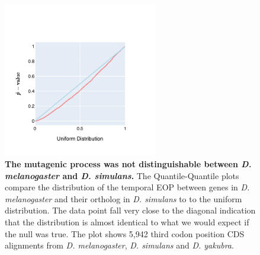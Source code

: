 \begin{figure}[htbp]
\centering
\includegraphics[width=0.6\textwidth]{figures/plots/drosophila/temp-EOP-QQ.pdf}
\caption{\textbf{The mutagenic process was not distinguishable between \textit{D. melanogaster} and \textit{D. simulans}.} The Quantile-Quantile plots compare the distribution of the temporal EOP between genes in \textit{D. melanogaster} and their ortholog in \textit{D. simulans} to  to the uniform distribution. The data point fall very close to the diagonal indication that the distribution is almost identical to what we would expect if the null was true. The plot shows 5,942 third codon position CDS alignments from \textit{D. melanogaster}, \textit{D. simulans} and \textit{D. yakubra}. }
\label{fig:drosophila:temp-EOP-qq}
\end{figure}
